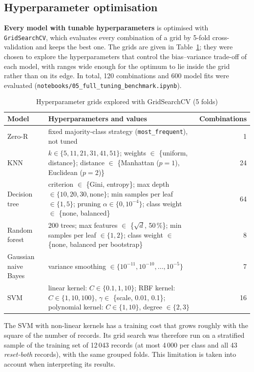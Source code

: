 \subsection{Hyperparameter optimisation}
\textbf{Every model with tunable hyperparameters} is optimised with \texttt{GridSearchCV}, which evaluates every combination of a grid by 5-fold cross-validation and keeps the best one. The grids are given in Table~\ref{tab:grids}; they were chosen to explore the hyperparameters that control the bias--variance trade-off of each model, with ranges wide enough for the optimum to lie inside the grid rather than on its edge. In total, 120 combinations and 600 model fits were evaluated (\texttt{notebooks/05\_full\_tuning\_benchmark.ipynb}).

\begin{table}[htbp]
  \centering
  \caption{Hyperparameter grids explored with GridSearchCV (5 folds)}
  \label{tab:grids}
  \small
  \begin{tabular}{|l|p{8.0cm}|r|}
    \hline
    \textbf{Model} & \textbf{Hyperparameters and values} & \textbf{Combinations} \\
    \hline
    Zero-R & fixed majority-class strategy (\texttt{most\_frequent}), not tuned & 1 \\
    \hline
    \ac{KNN} & $k \in \{5, 11, 21, 31, 41, 51\}$; weights $\in$ \{uniform, distance\}; distance $\in$ \{Manhattan ($p=1$), Euclidean ($p=2$)\} & 24 \\
    \hline
    Decision tree & criterion $\in$ \{Gini, entropy\}; max depth $\in \{10, 20, 30, \text{none}\}$; min samples per leaf $\in \{1, 5\}$; pruning $\alpha \in \{0, 10^{-4}\}$; class weight $\in$ \{none, balanced\} & 64 \\
    \hline
    Random forest & 200 trees; max features $\in$ \{$\sqrt{d}$, 50\,\%\}; min samples per leaf $\in \{1, 2\}$; class weight $\in$ \{none, balanced per bootstrap\} & 8 \\
    \hline
    Gaussian naive Bayes & variance smoothing $\in \{10^{-11}, 10^{-10}, \dots, 10^{-5}\}$ & 7 \\
    \hline
    \ac{SVM} & linear kernel: $C \in \{0.1, 1, 10\}$; RBF kernel: $C \in \{1, 10, 100\}$, $\gamma \in$ \{scale, 0.01, 0.1\}; polynomial kernel: $C \in \{1, 10\}$, degree $\in \{2, 3\}$ & 16 \\
    \hline
  \end{tabular}
\end{table}

The \ac{SVM} with non-linear kernels has a training cost that grows roughly with the square of the number of records. Its grid search was therefore run on a stratified sample of the training set of 12\,043 records (at most 4\,000 per class and all 43 \emph{reset-both} records), with the same grouped folds. This limitation is taken into account when interpreting its results.

